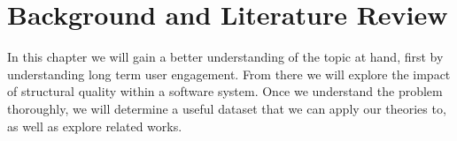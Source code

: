 \chapter{Background and Literature Review} \label{chapterBackground}





In this chapter we will gain a better understanding of the topic at hand, first by understanding long term user engagement. From there we will explore the impact of structural quality within a software system. Once we understand the problem thoroughly, we will determine a useful dataset that we can apply our theories to, as well as explore related works.
